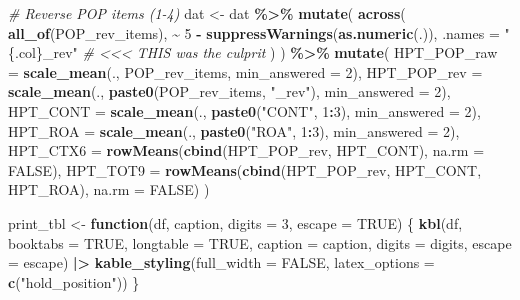 \documentclass[
  10pt,
]{article}
\newenvironment{Shaded}{\begin{snugshade}}{\end{snugshade}}
\newcommand{\AttributeTok}[1]{\textcolor[rgb]{0.13,0.29,0.53}{#1}}
\newcommand{\CommentTok}[1]{\textcolor[rgb]{0.56,0.35,0.01}{\textit{#1}}}
\newcommand{\ConstantTok}[1]{\textcolor[rgb]{0.56,0.35,0.01}{#1}}
\newcommand{\ControlFlowTok}[1]{\textcolor[rgb]{0.13,0.29,0.53}{\textbf{#1}}}
\newcommand{\DecValTok}[1]{\textcolor[rgb]{0.00,0.00,0.81}{#1}}
\newcommand{\FunctionTok}[1]{\textcolor[rgb]{0.13,0.29,0.53}{\textbf{#1}}}
\newcommand{\NormalTok}[1]{#1}
\newcommand{\OtherTok}[1]{\textcolor[rgb]{0.56,0.35,0.01}{#1}}
\newcommand{\SpecialCharTok}[1]{\textcolor[rgb]{0.81,0.36,0.00}{\textbf{#1}}}
\newcommand{\StringTok}[1]{\textcolor[rgb]{0.31,0.60,0.02}{#1}}
\begin{document}
\begin{Shaded}
\begin{Highlighting}[]
\CommentTok{\# Reverse POP items (1{-}4)}
\NormalTok{dat }\OtherTok{\textless{}{-}}\NormalTok{ dat }\SpecialCharTok{\%\textgreater{}\%}
  \FunctionTok{mutate}\NormalTok{(}
    \FunctionTok{across}\NormalTok{(}
      \FunctionTok{all\_of}\NormalTok{(POP\_rev\_items),}
      \SpecialCharTok{\textasciitilde{}} \DecValTok{5} \SpecialCharTok{{-}} \FunctionTok{suppressWarnings}\NormalTok{(}\FunctionTok{as.numeric}\NormalTok{(.)),}
      \AttributeTok{.names =} \StringTok{"\{.col\}\_rev"}     \CommentTok{\# \textless{}\textless{}\textless{} THIS was the culprit}
\NormalTok{    )}
\NormalTok{  ) }\SpecialCharTok{\%\textgreater{}\%}
  \FunctionTok{mutate}\NormalTok{(}
    \AttributeTok{HPT\_POP\_raw =} \FunctionTok{scale\_mean}\NormalTok{(., POP\_rev\_items, }\AttributeTok{min\_answered =} \DecValTok{2}\NormalTok{),}
    \AttributeTok{HPT\_POP\_rev =} \FunctionTok{scale\_mean}\NormalTok{(., }\FunctionTok{paste0}\NormalTok{(POP\_rev\_items, }\StringTok{"\_rev"}\NormalTok{), }\AttributeTok{min\_answered =} \DecValTok{2}\NormalTok{),}
    \AttributeTok{HPT\_CONT    =} \FunctionTok{scale\_mean}\NormalTok{(., }\FunctionTok{paste0}\NormalTok{(}\StringTok{"CONT"}\NormalTok{, }\DecValTok{1}\SpecialCharTok{:}\DecValTok{3}\NormalTok{), }\AttributeTok{min\_answered =} \DecValTok{2}\NormalTok{),}
    \AttributeTok{HPT\_ROA     =} \FunctionTok{scale\_mean}\NormalTok{(., }\FunctionTok{paste0}\NormalTok{(}\StringTok{"ROA"}\NormalTok{, }\DecValTok{1}\SpecialCharTok{:}\DecValTok{3}\NormalTok{), }\AttributeTok{min\_answered =} \DecValTok{2}\NormalTok{),}
    \AttributeTok{HPT\_CTX6    =} \FunctionTok{rowMeans}\NormalTok{(}\FunctionTok{cbind}\NormalTok{(HPT\_POP\_rev, HPT\_CONT), }\AttributeTok{na.rm =} \ConstantTok{FALSE}\NormalTok{),}
    \AttributeTok{HPT\_TOT9    =} \FunctionTok{rowMeans}\NormalTok{(}\FunctionTok{cbind}\NormalTok{(HPT\_POP\_rev, HPT\_CONT, HPT\_ROA),}
                           \AttributeTok{na.rm =} \ConstantTok{FALSE}\NormalTok{)}
\NormalTok{  )}

\NormalTok{print\_tbl }\OtherTok{\textless{}{-}} \ControlFlowTok{function}\NormalTok{(df, caption, }\AttributeTok{digits =} \DecValTok{3}\NormalTok{, }\AttributeTok{escape =} \ConstantTok{TRUE}\NormalTok{) \{}
  \FunctionTok{kbl}\NormalTok{(df, }\AttributeTok{booktabs =} \ConstantTok{TRUE}\NormalTok{, }\AttributeTok{longtable =} \ConstantTok{TRUE}\NormalTok{, }\AttributeTok{caption =}\NormalTok{ caption, }\AttributeTok{digits =}\NormalTok{ digits, }\AttributeTok{escape =}\NormalTok{ escape) }\SpecialCharTok{|\textgreater{}}
    \FunctionTok{kable\_styling}\NormalTok{(}\AttributeTok{full\_width =} \ConstantTok{FALSE}\NormalTok{, }\AttributeTok{latex\_options =} \FunctionTok{c}\NormalTok{(}\StringTok{"hold\_position"}\NormalTok{))}
\NormalTok{\}}
\end{Highlighting}
\end{Shaded}
\end{document}
